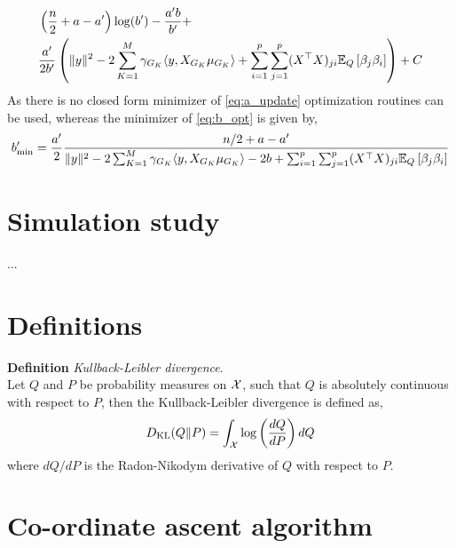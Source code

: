 \documentclass[12pt]{article}
\begin{document}
\begin{equation} \label{eq:b_opt}
\begin{aligned}
    & \left( \frac{n}{2} + a - a' \right) \log(b')
- 
    \frac{a'b}{b'}
+  \\
&
    \frac{a'}{2b'}
    \left( \| y \|^2 
- 
    2 \sum_{K=1}^M \gamma_{G_K} \langle y, X_{G_K} \mu_{G_K} \rangle
+  
    \sum_{i=1}^p \sum_{j=1}^p (X^\top X)_{ji} \mathbb{E}_Q \left[\beta_j \beta_i \right]
    \right) 
+ C
\end{aligned}
\end{equation}
As there is no closed form minimizer of \eqref{eq:a_update} optimization routines can be used, whereas the minimizer of \eqref{eq:b_opt} is given by,
\begin{equation*}
    b'_{\min} = 
\frac{a'}{2}
\frac{n/2 +a - a'}
{
    \| y \|^2 
- 
    2 \sum_{K=1}^M \gamma_{G_K} \langle y, X_{G_K} \mu_{G_K} \rangle
-
    2b
+  
    \sum_{i=1}^p \sum_{j=1}^p (X^\top X)_{ji} \mathbb{E}_Q \left[\beta_j \beta_i \right]
}
\end{equation*}



\newpage
\section{Simulation study}

...



\newpage


\appendix
{}


\section{Definitions}
\textbf{Definition} \textit{Kullback-Leibler divergence}.\\ Let $Q$ and $P$ be probability measures on $\mathcal{X}$, such that $ Q $ is absolutely continuous with respect to $P$, then the Kullback-Leibler divergence is defined as,
\begin{equation}\label{eq:kl}
D_\text{KL}(Q \| P) = \int_{\mathcal{X}} \log \left( \frac{dQ}{dP} \right) dQ
\end{equation}
where $dQ/dP$ is the Radon-Nikodym derivative of $Q$ with respect to $P$.


\section{Co-ordinate ascent algorithm}
\end{document}
